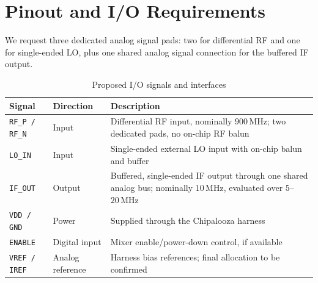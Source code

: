 
\section{Pinout and I/O Requirements}

We request three dedicated analog signal pads: two for differential RF and one for single-ended LO, plus one shared analog signal connection for the buffered IF output.

\begin{table}[htbp]
\centering
\caption{Proposed I/O signals and interfaces}
\label{tab:io}
\begin{tabularx}{\textwidth}{@{}llY@{}}
\toprule
\textbf{Signal} &
\textbf{Direction} &
\textbf{Description} \\
\midrule

\texttt{RF\_P / RF\_N} &
Input &
Differential RF input, nominally \(900\,\mathrm{MHz}\); two dedicated pads, no on-chip RF balun \\

\texttt{LO\_IN} &
Input &
Single-ended external LO input with on-chip balun and buffer \\

\texttt{IF\_OUT} &
Output &
Buffered, single-ended IF output through one shared analog bus; nominally \(10\,\mathrm{MHz}\), evaluated over \(5\)--\(20\,\mathrm{MHz}\) \\

\texttt{VDD / GND} &
Power &
Supplied through the Chipalooza harness \\

\texttt{ENABLE} &
Digital input &
Mixer enable/power-down control, if available \\

\texttt{VREF / IREF} &
Analog reference &
Harness bias references; final allocation to be confirmed \\

\bottomrule
\end{tabularx}
\end{table}

